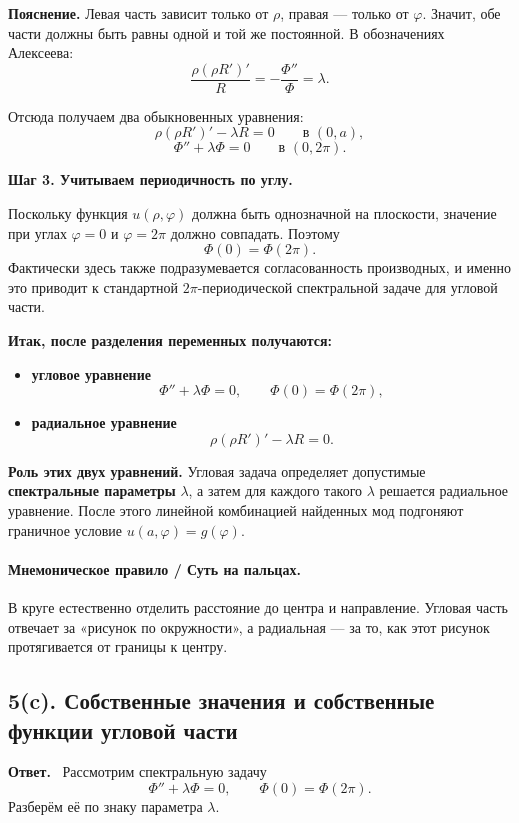 \documentclass[a4paper,12pt]{article}
\newcommand{\Answer}{\textbf{Ответ.}\ }
\begin{document}
\textbf{Пояснение.} Левая часть зависит только от $\rho$, правая --- только от $\varphi$. Значит, обе части должны быть равны одной и той же постоянной. В обозначениях Алексеева:
\[
\frac{\rho(\rho R')'}{R}
=
-\frac{\Phi''}{\Phi}
=\lambda.
\]

Отсюда получаем два обыкновенных уравнения:
\[
\rho(\rho R')'-\lambda R=0
\qquad \text{в } (0,a),
\]
\[
\Phi''+\lambda\Phi=0
\qquad \text{в } (0,2\pi).
\]

\textbf{Шаг 3. Учитываем периодичность по углу.}

Поскольку функция $u(\rho,\varphi)$ должна быть однозначной на плоскости, значение при углах $\varphi=0$ и $\varphi=2\pi$ должно совпадать. Поэтому
\[
\Phi(0)=\Phi(2\pi).
\]
Фактически здесь также подразумевается согласованность производных, и именно это приводит к стандартной $2\pi$-периодической спектральной задаче для угловой части.

\textbf{Итак, после разделения переменных получаются:}
\begin{itemize}
  \item \textbf{угловое уравнение}
  \[
  \Phi''+\lambda\Phi=0,
  \qquad
  \Phi(0)=\Phi(2\pi),
  \]
  \item \textbf{радиальное уравнение}
  \[
  \rho(\rho R')'-\lambda R=0.
  \]
\end{itemize}

\textbf{Роль этих двух уравнений.}
Угловая задача определяет допустимые \textbf{спектральные параметры} $\lambda$, а затем для каждого такого $\lambda$ решается радиальное уравнение. После этого линейной комбинацией найденных мод подгоняют граничное условие $u(a,\varphi)=g(\varphi)$.

\paragraph{Мнемоническое правило / Суть на пальцах.}
В круге естественно отделить расстояние до центра и направление. Угловая часть отвечает за «рисунок по окружности», а радиальная --- за то, как этот рисунок протягивается от границы к центру.

\subsection*{5(c). Собственные значения и собственные функции угловой части}

\Answer
Рассмотрим спектральную задачу
\[
\Phi''+\lambda\Phi=0,
\qquad
\Phi(0)=\Phi(2\pi).
\]
Разберём её по знаку параметра $\lambda$.
\end{document}
